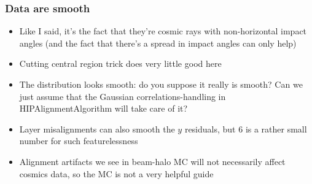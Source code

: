 \documentclass[compress]{beamer}
\begin{document}
\begin{frame}
\frametitle{Data are smooth}
\scriptsize
\begin{itemize}
\item Like I said, it's the fact that they're cosmic rays with
  non-horizontal impact angles (and the fact that there's a spread in
  impact angles can only help)
\item Cutting central region trick does very little good here
\item The distribution looks smooth: do you suppose it really is
  smooth?  Can we just assume that the Gaussian correlations-handling
  in HIPAlignmentAlgorithm will take care of it?
\item Layer misalignments can also smooth the $y$ residuals, but 6 is
  a rather small number for such featurelessness
\item Alignment artifacts we see in beam-halo MC will not necessarily
  affect cosmics data, so the MC is not a very helpful guide
\end{itemize}


\end{frame}
\end{document}
